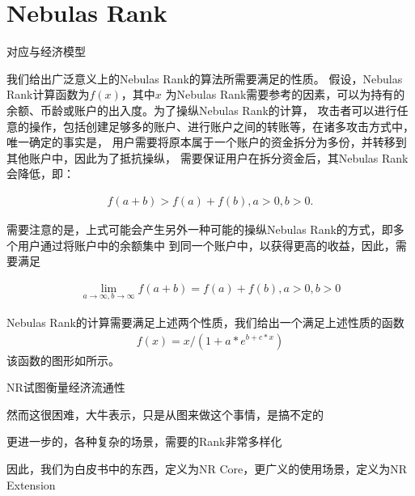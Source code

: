 \section{Nebulas Rank}
对应与经济模型

我们给出广泛意义上的Nebulas Rank的算法所需要满足的性质。
假设，Nebulas Rank计算函数为\(f(x)\)，其中\(x\)
为Nebulas Rank需要参考的因素，可以为持有的余额、币龄或账户的出入度。为了操纵Nebulas Rank的计算，
攻击者可以进行任意的操作，包括创建足够多的账户、进行账户之间的转账等，在诸多攻击方式中，唯一确定的事实是，
{\color{red} 用户需要将原本属于一个账户的资金拆分为多份，并转移到其他账户中}，因此为了抵抗操纵，
需要保证用户在拆分资金后，其Nebulas Rank会降低，即：

\begin{align}
f(a + b) > f(a) + f(b), a>0, b>0.
\end{align}

需要注意的是，上式可能会产生另外一种可能的操纵Nebulas Rank的方式，即多个用户通过将账户中的余额集中
到同一个账户中，以获得更高的收益，因此，需要满足

\begin{align}
\lim\limits_{a \to \infty, b\to \infty} f(a+b) = f(a) + f(b), a>0, b>0
\end{align}

Nebulas Rank的计算需要满足上述两个性质，我们给出一个满足上述性质的函数
\begin{align}
f(x) = x/(1 + a*e^{b + c*x})
\end{align}
\noindent 该函数的图形如所示。


NR试图衡量经济流通性

然而这很困难，大牛表示，只是从图来做这个事情，是搞不定的

更进一步的，各种复杂的场景，需要的Rank非常多样化

因此，我们为白皮书中的东西，定义为NR Core，更广义的使用场景，定义为NR Extension
